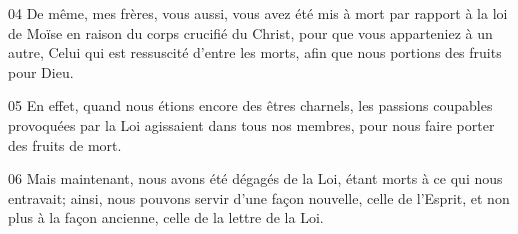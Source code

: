 
04 De même, mes frères, vous aussi, vous avez été mis à mort par rapport à la loi de Moïse en raison du corps crucifié du Christ, pour que vous apparteniez à un autre, Celui qui est ressuscité d’entre les morts, afin que nous portions des fruits pour Dieu.

05 En effet, quand nous étions encore des êtres charnels, les passions coupables provoquées par la Loi agissaient dans tous nos membres, pour nous faire porter des fruits de mort.

06 Mais maintenant, nous avons été dégagés de la Loi, étant morts à ce qui nous entravait; ainsi, nous pouvons servir d’une façon nouvelle, celle de l’Esprit, et non plus à la façon ancienne, celle de la lettre de la Loi.
